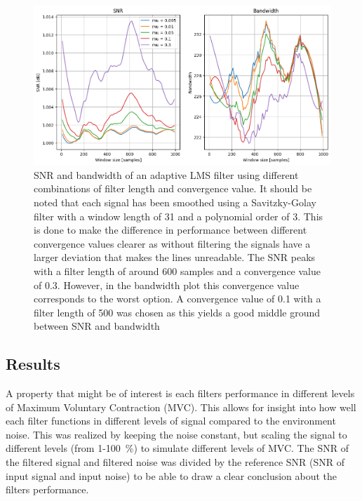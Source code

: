 \begin{figure}[h!t]
	\begin{center}
		\includegraphics[width=1.0\columnwidth]{images/lms_filter_windowsize.png}
	\end{center}
	\caption{SNR and bandwidth of an adaptive LMS filter using different combinations of filter length and convergence value. It should be noted that each signal has been smoothed using a Savitzky-Golay filter with a window length of 31 and a polynomial order of 3. This is done to make the difference in performance between different convergence values clearer as without filtering the signals have a larger deviation that makes the lines unreadable. The SNR peaks with a filter length of around 600 samples and a convergence value of 0.3. However, in the bandwidth plot this convergence value corresponds to the worst option. A convergence value of 0.1 with a filter length of 500 was chosen as this yields a good middle ground between SNR and bandwidth}
	\label{fig:lms_filter_windowsize}
\end{figure}


\subsection{Results}
A property that might be of interest is each filters performance in different levels of Maximum Voluntary Contraction (MVC). This allows for insight into how well each filter functions in different levels of signal compared to the environment noise. This was realized by keeping the noise constant, but scaling the signal to different levels (from 1-\SI{100}{\percent}) to simulate different levels of MVC. The SNR of the filtered signal and filtered noise was divided by the reference SNR (SNR of input signal and input noise) to be able to draw a clear conclusion about the filters performance.

